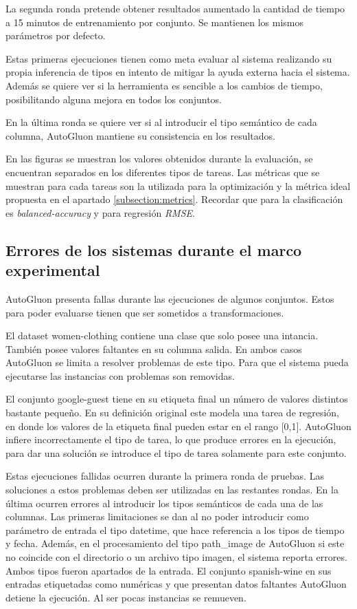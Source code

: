 La segunda ronda pretende obtener resultados aumentado la cantidad de tiempo a 15 minutos de entrenamiento por conjunto. Se mantienen los mismos parámetros por defecto.

Estas primeras ejecuciones tienen como meta evaluar al sistema realizando su propia inferencia de tipos en intento de mitigar la ayuda externa hacia el sistema. Además 
se quiere ver si la herramienta es sencible a los cambios de tiempo, posibilitando alguna mejora en todos los conjuntos.

En la última ronda se quiere ver si al introducir el tipo semántico de cada columna, AutoGluon mantiene su consistencia en los resultados. 

En las figuras se muestran los valores obtenidos durante la evaluación, se encuentran separados en los diferentes tipos de tareas. Las métricas que se muestran
para cada tareas son la utilizada para la optimización y la métrica ideal propuesta en el apartado \ref{subsection:metrics}. 
Recordar que para la clasificación es \textit{balanced-accuracy} y para regresión \textit{RMSE}.

\subsection{Errores de los sistemas durante el marco experimental}\label{subsection:errors}
AutoGluon presenta fallas durante las ejecuciones de algunos conjuntos. Estos para poder evaluarse tienen que ser sometidos a transformaciones.

El dataset women-clothing contiene una clase que solo posee una intancia. También posee valores faltantes en su columna salida. En ambos casos AutoGluon se 
limita a resolver problemas de este tipo. Para que el sistema pueda ejecutarse las instancias con problemas son removidas.

El conjunto google-guest tiene en su etiqueta final un número de valores distintos bastante pequeño. En su definición original este modela una tarea de regresión, en 
donde los valores de la etiqueta final pueden estar en el rango [0,1]. AutoGluon infiere incorrectamente el tipo de tarea, lo que produce errores en la ejecución, para 
dar una solución se introduce el tipo de tarea solamente para este conjunto.

Estas ejecuciones fallidas ocurren durante la primera ronda de pruebas. Las soluciones a estos problemas deben ser utilizadas en las restantes rondas. 
En la última ocurren errores al introducir los tipos semánticos de cada una de las columnas. Las primeras limitaciones se dan al no poder introducir como 
parámetro de entrada el tipo datetime, que hace referencia a los tipos de tiempo y fecha. Además, en el procesamiento del tipo path\_image de AutoGluon si este no 
coincide con el directorio o un archivo tipo imagen, el sistema reporta errores. Ambos tipos fueron apartados de la entrada. 
El conjunto spanish-wine en sus entradas etiquetadas como numéricas y que presentan datos faltantes AutoGluon detiene la ejecución. Al ser pocas instancias se remueven.

